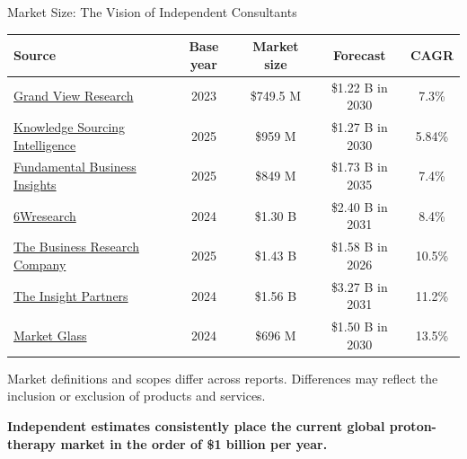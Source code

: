 \documentclass[aspectratio=169,11pt]{beamer}
\begin{document}
\begin{frame}{Market Size: The Vision of Independent Consultants}

\centering

\renewcommand{\arraystretch}{1.18}
\setlength{\tabcolsep}{4pt}

\footnotesize

\begin{tabular}{@{}p{4.0cm} c c c c@{}}
\toprule
\textbf{Source} &
\textbf{Base year} &
\textbf{Market size} &
\textbf{Forecast} &
\textbf{CAGR} \\
\midrule

\href{https://www.grandviewresearch.com/industry-analysis/proton-therapy-systems-market}
{Grand View Research}
& 2023
& \$749.5 M
& \$1.22 B in 2030
& 7.3\% \\

\href{https://www.researchandmarkets.com/reports/6091787/proton-therapy-market-forecasts}
{Knowledge Sourcing Intelligence}
& 2025
& \$959 M
& \$1.27 B in 2030
& 5.84\% \\

\href{https://www.fundamentalbusinessinsights.com/industry-report/proton-therapy-systems-market-8081}
{Fundamental Business Insights}
& 2025
& \$849 M
& \$1.73 B in 2035
& 7.4\% \\

\href{https://www.6wresearch.com/industry-report/global-proton-therapy-systems-market}
{6Wresearch}
& 2024
& \$1.30 B
& \$2.40 B in 2031
& 8.4\% \\

\href{https://www.thebusinessresearchcompany.com/report/proton-therapy-systems-global-market-report}
{The Business Research Company}
& 2025
& \$1.43 B
& \$1.58 B in 2026
& 10.5\% \\

\href{https://www.researchandmarkets.com/reports/5954217/proton-therapy-systems-market}
{The Insight Partners}
& 2024
& \$1.56 B
& \$3.27 B in 2031
& 11.2\% \\

\href{https://www.researchandmarkets.com/reports/5309802/proton-therapy-global-strategic-business-report}
{Market Glass}
& 2024
& \$696 M
& \$1.50 B in 2030
& 13.5\% \\

\bottomrule
\end{tabular}

\vspace{0.35cm}

\tiny
Market definitions and scopes differ across reports. Differences may reflect the inclusion or exclusion
of products and services.

\vspace{0.3cm}

\normalsize
\centering
\textbf{
Independent estimates consistently place the current global
proton-therapy market in the order of \$1 billion per year.
}
\end{frame}
\end{document}
